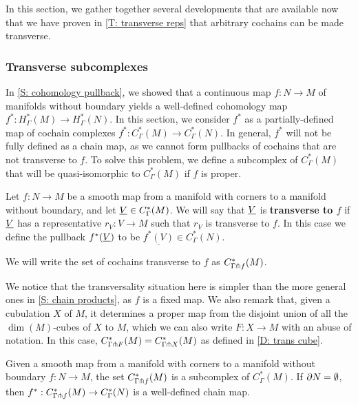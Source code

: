 In this section, we gather together several developments that are available now that we have proven in \cref{T: transverse reps} that arbitrary cochains can be made transverse.

\subsubsection{Transverse subcomplexes}\label{S: product pullbacks}
In \cref{S: cohomology pullback}, we showed that a continuous map $f \colon N \to M$ of manifolds without boundary yields a well-defined cohomology map $f^* \colon H^*_\Gamma(M) \to H^*_\Gamma(N)$.
In this section, we consider $f^*$ as a partially-defined map of cochain complexes $f^* \colon C^*_\Gamma(M) \to C^*_\Gamma(N)$.
In general, $f^*$ will not be fully defined as a chain map, as we cannot form pullbacks of cochains that are not transverse to $f$.
To solve this problem, we define a subcomplex of $C^*_\Gamma(M)$ that will be quasi-isomorphic to $C^*_\Gamma(M)$ if $f$ is proper.

\begin{definition}\label{D: transverse to map}
	Let $f \colon N \to M$ be a smooth map from a manifold with corners to a manifold without boundary, and let $\underline{V} \in C^*_\Gamma(M)$.
	We will say that $\underline{V}$ is \textbf{transverse to $f$} if $\underline{V}$ has a representative $r_V \colon V \to M$ such that $r_V$ is transverse to $f$.
	In this case we define the pullback $f^*(\underline{V})$ to be $\underline{f^*(V)} \in C^*_\Gamma(N)$.

	We will write the set of cochains transverse to $f$ as $C^*_{\Gamma \pitchfork f}(M)$.
\end{definition}

We notice that the transversality situation here is simpler than the more general ones in \cref{S: chain products}, as $f$ is a fixed map.
We also remark that, given a cubulation $X$ of $M$, it determines a proper map from the disjoint union of all the $\dim(M)$-cubes of $X$ to $M$, which we can also write $F \colon X \to M$ with an abuse of notation.
In this case, $C^*_{\Gamma \pitchfork F}(M) = C^*_{\Gamma \pitchfork X}(M)$ as defined in \cref{D: trans cube}.

\begin{proposition}\label{P: trans to f}
	Given a smooth map from a manifold with corners to a manifold without boundary $f \colon N \to M$, the set $C^*_{\Gamma \pitchfork f}(M)$ is a subcomplex of $C^*_{\Gamma}(M)$.
	If $\partial N = \emptyset$, then $f^*:C^*_{\Gamma \pitchfork f}(M) \to C^*_{\Gamma}(N)$ is a well-defined chain map.
\end{proposition}

